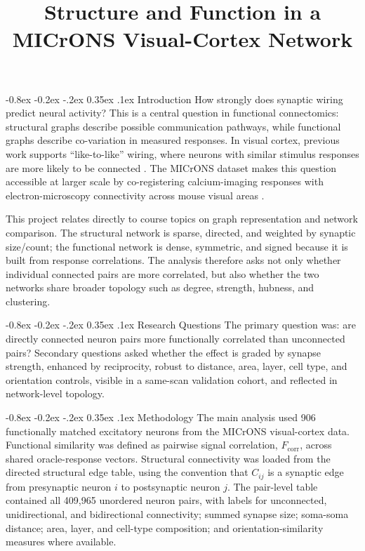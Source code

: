 \documentclass[10pt,twocolumn]{article}
\title{\vspace{-1.2cm}\textbf{Structure and Function in a MICrONS Visual-Cortex Network}}
\author{}
\date{\vspace{-1.0cm}}
\makeatletter
\renewcommand\section{\@startsection {section}{1}{\z@}%
  {-0.8ex \@plus -0.2ex \@minus -.2ex}%
  {0.35ex \@plus.1ex}%
  {\normalfont\large\bfseries}}
\newcommand{\fcorr}{F_{\mathrm{corr}}}
\makeatother
\begin{document}
\maketitle
\thispagestyle{empty}
\pagestyle{empty}

\section{Introduction}
How strongly does synaptic wiring predict neural activity? This is a central question in functional connectomics: structural graphs describe possible communication pathways, while functional graphs describe co-variation in measured responses. In visual cortex, previous work supports ``like-to-like'' wiring, where neurons with similar stimulus responses are more likely to be connected \cite{ko2011,cossell2015,ding2025}. The MICrONS dataset makes this question accessible at larger scale by co-registering calcium-imaging responses with electron-microscopy connectivity across mouse visual areas \cite{microns2025}. 

This project relates directly to course topics on graph representation and network comparison. The structural network is sparse, directed, and weighted by synaptic size/count; the functional network is dense, symmetric, and signed because it is built from response correlations. The analysis therefore asks not only whether individual connected pairs are more correlated, but also whether the two networks share broader topology such as degree, strength, hubness, and clustering.

\section{Research Questions}
The primary question was: are directly connected neuron pairs more functionally correlated than unconnected pairs? Secondary questions asked whether the effect is graded by synapse strength, enhanced by reciprocity, robust to distance, area, layer, cell type, and orientation controls, visible in a same-scan validation cohort, and reflected in network-level topology.

\section{Methodology}
The main analysis used 906 functionally matched excitatory neurons from the MICrONS visual-cortex data. Functional similarity was defined as pairwise signal correlation, $\fcorr$, across shared oracle-response vectors. Structural connectivity was loaded from the directed structural edge table, using the convention that $C_{ij}$ is a synaptic edge from presynaptic neuron $i$ to postsynaptic neuron $j$. The pair-level table contained all 409,965 unordered neuron pairs, with labels for unconnected, unidirectional, and bidirectional connectivity; summed synapse size; soma-soma distance; area, layer, and cell-type composition; and orientation-similarity measures where available.
\end{document}
